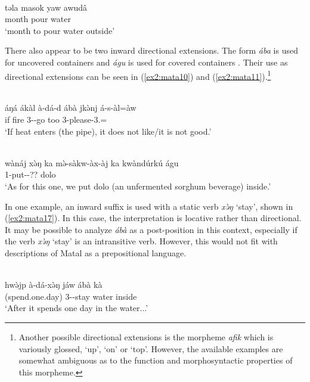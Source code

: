 \ex\label{ex2:mata8}
 \\
\gll təla masok yaw awudâ 		\\
month pour water  \\
\glt `month to pour water outside'
\z 

There also appear to be two inward directional extensions. The form \textit{ába} is used for uncovered containers and \textit{águ} is used for covered containers \citep[76]{dougopheGrammarMatal2021}. Their use as directional extensions can be seen in (\ref{ex2:mata10}) and (\ref{ex2:mata11}).\footnote{Another possible directional extensions is the morpheme \textit{afik} which is variously glossed, `up', `on' or `top'. However, the available examples are somewhat ambiguous as to the function and morphosyntactic properties of this morpheme.}

\ea\label{ex2:mata10}
 \\
\gll áŋá ákàl à-dá-d ábà jkə̀nj á-s-àl=àw	\\
if fire 3--go  too 3-please-3.=	\\
\glt `If heat enters (the pipe), it does not like/it is not good.'

\ex\label{ex2:mata11}
 \\
\gll  wànáj xə̀ŋ ka mə̀-sàkw-àx-àj ka kwàndúrkú águ	\\
   1-put--??  dolo 		\\
\glt `As for this one, we put dolo (an unfermented sorghum beverage) inside.'
\z 

In one example, an inward suffix is used with a static verb \textit{xə̀ŋ} `stay', shown in (\ref{ex2:mata17}). In this case, the interpretation is locative rather than directional. It may be possible to analyze \textit{ábà} as a post-position in this context, especially if the verb \textit{xə̀ŋ} `stay' is an intransitive verb. However, this would not fit with descriptions of Matal as a prepositional language.

\ea\label{ex2:mata17}
 \\
\gll hwə̀jp à-dá-xə̀ŋ jáw ábà kà	\\
(spend.one.day) 3--stay water inside 		\\
\glt `After it spends one day in the water...'
\z 

